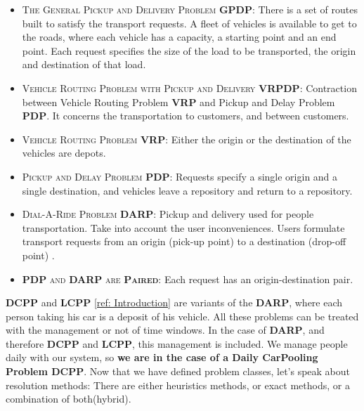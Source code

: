 \documentclass[12pt, a4paper,twoside]{memoir}
\newcommand{\newpar}{\vskip 0.2in \noindent}
\newcommand\tab[1][1cm]{\hspace*{#1}}
\begin{document}
	\begin{itemize}
		\item \textsc{The General Pickup and Delivery Problem \textbf{GPDP}}: \newline
		\tab There is a set of routes built to satisfy the transport requests. \newline
		\tab A fleet of vehicles is available to get to the roads, where each vehicle has a capacity, a starting point and an end point. \newline
		\tab Each request specifies the size of the load to be transported, the origin and destination of that load. 
		\item \textsc{Vehicle Routing Problem with Pickup and Delivery \textbf{VRPDP}}: \newline
		\tab Contraction between Vehicle Routing Problem \textbf{VRP} and Pickup and Delay Problem \textbf{PDP}.\newline
		\tab It concerns the transportation to customers, and between customers. 
		\item \textsc{Vehicle Routing Problem \textbf{VRP}}: \newline
		\tab Either the origin or the destination of the vehicles are depots.
		\item \textsc{Pickup and Delay Problem \textbf{PDP}}: \newline
		\tab Requests specify a single origin and a single destination, and vehicles leave a repository and return to a repository. 
		\item \textsc{Dial-A-Ride Problem \textbf{DARP}}: \newline
		\tab Pickup and delivery used for people transportation. \newline
		\tab Take into account the user inconveniences.\newline
		\tab Users formulate transport requests from an origin (pick-up point) to a destination (drop-off point) \cite{yanoptimization2011}. 
		\item \textsc{\textbf{PDP} and \textbf{DARP} are \textbf{Paired}}: \newline
		\tab Each request has an origin-destination pair.
	\end{itemize}
	\textbf{DCPP} and \textbf{LCPP} \hyperref[sec:The kinds of carpooling]{[ref: Introduction]} are variants of the \textbf{DARP}, where each person taking his car is a deposit of his vehicle.
	\newpar
	All these problems can be treated with the management or not of time windows. In the case of \textbf{DARP}, and therefore \textbf{DCPP} and \textbf{LCPP}, this management is included. \newline
	We manage people daily with our system, so \textbf{we are in the case of a Daily CarPooling Problem DCPP}.
	\newpar
	Now that we have defined problem classes, let's speak about resolution methods: There are either heuristics methods, or exact methods, or a combination of both(hybrid).
	
\end{document}
